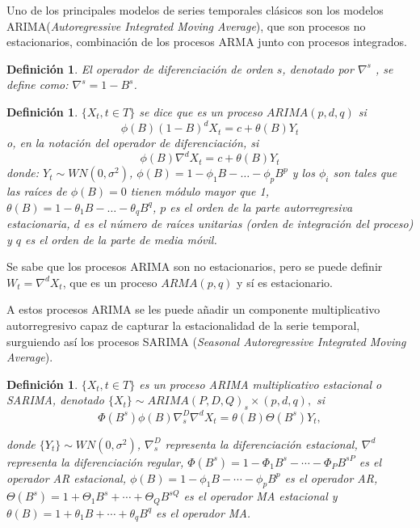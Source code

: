 \documentclass[12pt,twoside]{article}
\newtheorem{definition}[theorem]{Definición}
\begin{document}
Uno de los principales modelos de series temporales clásicos son los modelos ARIMA(\textit{Autoregressive Integrated Moving Average}), que son procesos no estacionarios, combinación de los procesos ARMA junto con procesos integrados.

\begin{definition}El operador de diferenciación de orden $s$, denotado por $\nabla^s$ , se define como: $\nabla^s = 1 - B^s$.
\end{definition}


\begin{definition}
$\{X_t, t \in T\}$ se dice que es un proceso $ARIMA(p,d,q)$ si  
\begin{equation}
\phi(B)(1 - B)^d X_t = c + \theta(B) Y_t
\end{equation}
o, en la notación del operador de diferenciación, si  
\begin{equation}
\phi(B) \nabla^d X_t = c + \theta(B) Y_t
\end{equation}
donde: $Y_t \sim WN(0, \sigma^2)$, $\phi(B) = 1 - \phi_1 B - \dots - \phi_p B^p$ y los \( \phi_i \) son tales que las raíces de $\phi(B) = 0$ tienen módulo mayor que 1, $\theta(B) = 1 - \theta_1 B - \dots - \theta_q B^q$, $p$ es el orden de la parte autorregresiva estacionaria, $d$ es el número de raíces unitarias (orden de integración del proceso) y $q$ es el orden de la parte de media móvil.
\end{definition}

Se sabe que los procesos ARIMA son no estacionarios, pero se puede definir $W_t = \nabla^dX_t$, que es un proceso $ARMA(p,q)$ y sí es estacionario.

A estos procesos ARIMA se les puede añadir un componente multiplicativo autorregresivo capaz de capturar la estacionalidad de la serie temporal, surguiendo así los procesos SARIMA (\textit{Seasonal Autoregressive Integrated Moving Average}).

\begin{definition}
$\{X_t, t \in T\}$ es un proceso ARIMA multiplicativo estacional o SARIMA, denotado $\{X_t\} \sim ARIMA(P,D,Q)_s \times (p,d,q),$ si
\begin{equation}
\Phi(B^s)\phi(B)\nabla_s^D \nabla^d X_t = \theta(B)\Theta(B^s)Y_t,
\end{equation}

donde $\{Y_t\} \sim WN(0, \sigma^2)$, $\nabla_s^D$ representa la diferenciación estacional, $\nabla^d$ representa la diferenciación regular, $\Phi(B^s) = 1 - \Phi_1 B^s - \cdots - \Phi_P B^{sP}$ es el operador AR estacional, $\phi(B) = 1 - \phi_1 B - \cdots - \phi_p B^p$ es el operador AR, $\Theta(B^s) = 1 + \Theta_1 B^s + \cdots + \Theta_Q B^{sQ}$ es el operador MA estacional y $\theta(B) = 1 + \theta_1 B + \cdots + \theta_q B^q$ es el operador MA.
\end{definition}
\end{document}
